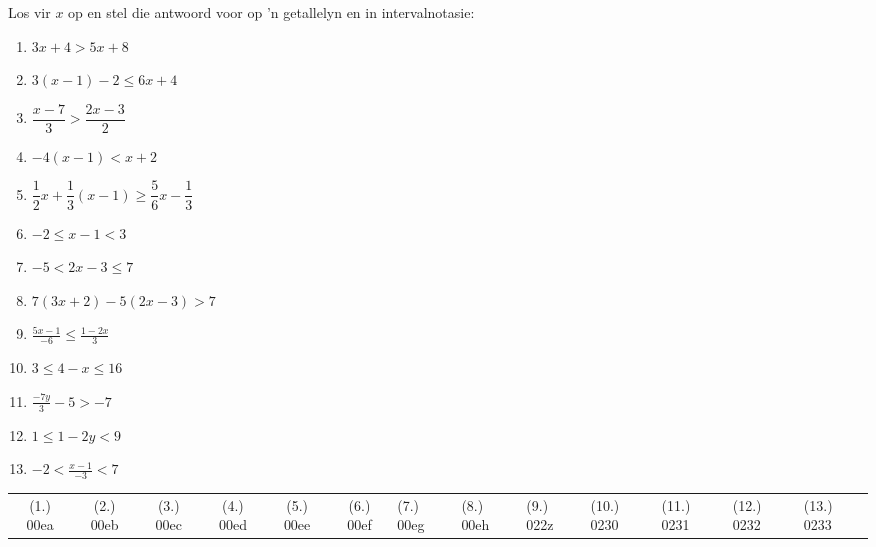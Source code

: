 \begin{exercises}{ }
{
Los vir $x$ op en stel die antwoord voor op 'n getallelyn en in intervalnotasie:
\begin{enumerate}[itemsep=6pt, label=\textbf{\arabic*}. ] 
    \item $3x+4>5x+8$
    \item $3(x-1)-2\leq 6x+4$ 
    \item $\dfrac{x-7}{3}>\dfrac{2x-3}{2}$
    \item $-4(x-1)<x+2$
    \item $\dfrac{1}{2}x+\dfrac{1}{3}(x-1)\geq \dfrac{5}{6}x-\dfrac{1}{3}$ 
    \item $-2\leq x-1<3$ 
    \item $-5<2x-3\leq7$ 
\item $7(3x+2)-5(2x-3)>7$
\item $\frac{5x - 1}{-6} \leq \frac{1-2x}{3}$
\item $3 \leq 4 - x \leq 16$
\item $\frac{-7y}{3} - 5 > -7$
\item $1 \leq 1 - 2y < 9$
\item $-2 < \frac{x-1}{-3}<7$
    \end{enumerate}

\practiceinfo

\par \begin{tabular}[h]{cccccc}
(1.) 00ea&  (2.) 00eb&  (3.) 00ec& (4.) 00ed& (5.) 00ee& (6.) 00ef& (7.) 00eg& (8.) 00eh & (9.) 022z & (10.) 0230 
& (11.) 0231 & (12.) 0232 & (13.) 0233 &\end{tabular}
}
\end{exercises}



